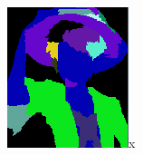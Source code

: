 \documentclass{beamer}
\begin{document}
\begin{frame}
\begin{figure}
\begin{subfigure}{0.24\textwidth}
\includegraphics[width=\textwidth]{../images/luffy_match1.png}x
\end{subfigure}
\begin{subfigure}{0.24\textwidth}

\end{subfigure}
\end{figure}
\end{frame}
\end{document}

